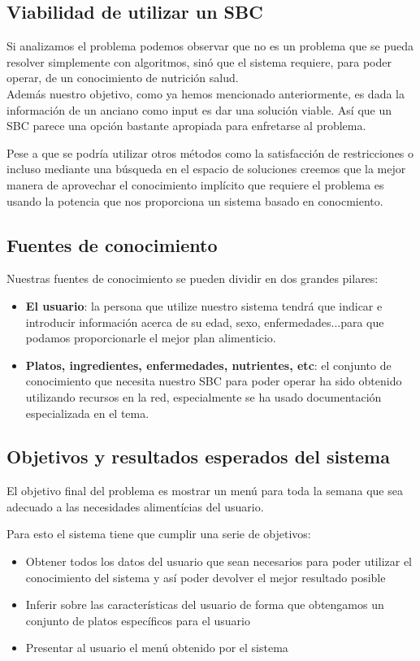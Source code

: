 \documentclass[12]{article}
\begin{document}
\subsection{Viabilidad de utilizar un SBC}
Si analizamos el problema podemos observar que no es un problema que se pueda resolver simplemente con algoritmos, sinó que el sistema requiere, para poder operar, de un conocimiento de nutrición salud.
\\
Además nuestro objetivo, como ya hemos mencionado anteriormente, es dada la información de un anciano como input es dar una solución viable. Así que un SBC parece una opción bastante apropiada para enfretarse al problema. 
\medskip

Pese a que se podría utilizar otros métodos como la satisfacción de restricciones o incluso mediante una búsqueda en el espacio de soluciones creemos que la mejor manera de aprovechar el conocimiento implícito que requiere el problema es usando la potencia que nos proporciona un sistema basado en conocmiento.

\subsection{Fuentes de conocimiento}

Nuestras fuentes de conocimiento se pueden dividir en dos grandes pilares:
\begin{itemize}
	\item \textbf{El usuario}: la persona que utilize nuestro sistema tendrá que indicar e introducir información acerca de su edad, sexo, enfermedades...para que podamos proporcionarle el mejor plan alimenticio. %
	\item \textbf{Platos, ingredientes, enfermedades, nutrientes, etc}: el conjunto de conocimiento que necesita nuestro SBC para poder operar ha sido obtenido utilizando recursos en la red, especialmente se ha usado documentación especializada en el tema. 
\end{itemize}


\subsection{Objetivos y resultados esperados del sistema}
El objetivo final del problema es mostrar un menú para toda la semana que sea adecuado a las necesidades alimentícias del usuario. 
\medskip

Para esto el sistema tiene que cumplir una serie de objetivos: 
\begin{itemize}
	\item Obtener todos los datos del usuario que sean necesarios para poder utilizar el conocimiento del sistema y así poder devolver el mejor resultado posible
	\item Inferir sobre las características del usuario de forma que obtengamos un conjunto de platos específicos para el usuario
	\item Presentar al usuario el menú obtenido por el sistema		
\end{itemize}
\end{document}
